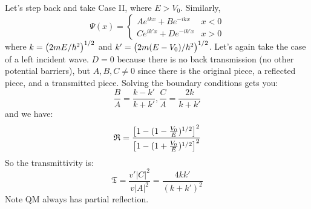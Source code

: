 Let's step back and take Case II, where $E > V_0$. Similarly,
\[ \Psi(x) = \begin{cases}
    Ae^{ikx} + Be^{-ikx} & x < 0 \\
    Ce^{ik'x} + De^{-ik'x} & x > 0
\end{cases} \]
where $k = \qty(2mE/\hbar^2)^{1/2}$ and $k' = \qty(2m(E - V_0)/\hbar^2)^{1/2}$. Let's again take the case of a left incident wave. $D = 0$ because there is no
back transmission (no other potential barriers), but $A, B, C \neq 0$ since there is the original piece, a reflected piece, and a transmitted piece.
Solving the boundary conditions gets you:
\[ \frac{B}{A} = \frac{k - k'}{k + k'}, \frac{C}{A} = \frac{2k}{k + k'} \]
and we have:
\[ \mathfrak{R} = \frac{\qty[1 - (1 - \frac{V_0}{E})^{1/2}]^2}{\qty[1 - (1 + \frac{V_0}{E})^{1/2}]^2} \]
So the transmittivity is:
\[ \mathfrak{T} = \frac{v' |C|^2}{v |A|^2} = \frac{4kk'}{(k + k')^2} \]
Note QM always has partial reflection.